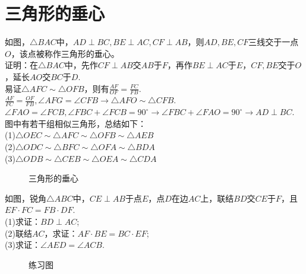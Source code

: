 \section{三角形的垂心}
\begin{definition}
    如图，$\triangle BAC$中，$AD\perp BC,BE\perp AC,CF\perp AB$，则$AD,BE,CF$三线交于一点$O$，该点被称作三角形的垂心。\\
    证明：在$\triangle BAC$中，先作$CF\perp AB$交$AB$于$F$，再作$BE\perp AC$于$E$，$CF,BE$交于$O$，延长$AO$交$BC$于$D$. \\
    易证$\triangle AFC\sim \triangle OFB$，则有$\frac{AF}{OF}=\frac{FC}{FB}.$ \\
    $\frac{AF}{FC}=\frac{OF}{FB},\angle AFG=\angle CFB\rightarrow \triangle AFO \sim \triangle  CFB.$ \\
    $\angle FAO=\angle FCB, \angle FBC+\angle FCB=90^\circ \rightarrow \angle FBC+\angle FAO=90^\circ \rightarrow AD\perp BC.$ \\
    图中有若干组相似三角形，总结如下： \\
    (1)$\triangle OEC \sim \triangle AFC \sim \triangle OFB \sim \triangle AEB $ \\
    (2)$\triangle ODC \sim \triangle BFC \sim \triangle OFA \sim \triangle BDA $ \\
    (3)$\triangle ODB \sim \triangle CEB \sim \triangle OEA \sim \triangle CDA $ \\
\end{definition}
\begin{figure}[H]
    \centering
    \resizebox{4cm}{!}{}
    \caption{三角形的垂心}
\end{figure}
\begin{problem}
如图，锐角$\triangle ABC$中，$CE\perp AB$于点$E$，点$D$在边$AC$上，联结$BD$交$CE$于$F$，且$EF·FC=FB·DF$. \\
(1)求证：$BD\perp AC$; \\
(2)联结$AC$，求证：$AF·BE=BC·EF$; \\
(3)求证：$\angle AED=\angle ACB$. \\
\end{problem}
\begin{figure}[H]
    \centering
    \resizebox{4cm}{!}{}
    \caption{练习图}
\end{figure}
\clearpage
